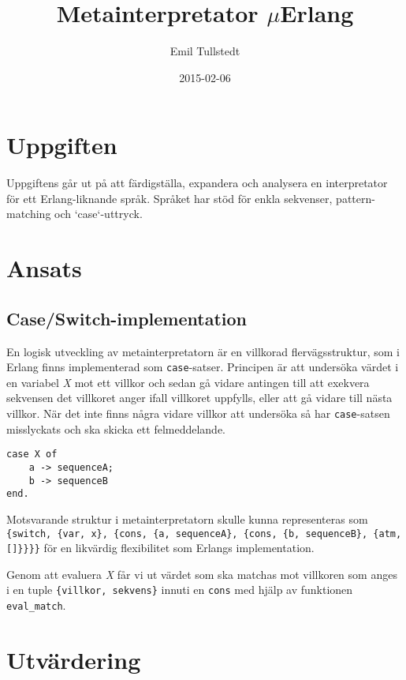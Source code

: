 \documentclass[a4paper, 11pt]{article}
\title{Metainterpretator $\mu$Erlang}
\author{Emil Tullstedt}
\date{2015-02-06}
\begin{document}
\maketitle

\section{Uppgiften}

Uppgiftens går ut på att färdigställa, expandera och analysera en interpretator för ett Erlang-liknande språk. Språket har stöd för enkla sekvenser, pattern-matching och `case`-uttryck.

\section{Ansats}

\subsection{Case/Switch-implementation}
En logisk utveckling av metainterpretatorn är en villkorad flervägsstruktur, som i Erlang finns implementerad som \texttt{case}-satser. Principen är att under\-söka värdet i en variabel \textit{X} mot ett villkor och sedan gå vidare antingen till att exekvera sekvensen det villkoret anger ifall villkoret uppfylls, eller att gå vidare till nästa villkor. När det inte finns några vidare villkor att undersöka så har \texttt{case}-satsen misslyckats och ska skicka ett fel\-meddel\-ande.

\begin{lstlisting}
case X of
    a -> sequenceA;
    b -> sequenceB
end.
\end{lstlisting}

Motsvarande struktur i metainterpretatorn skulle kunna representeras som \\ \lstinline${switch, {var, x}, {cons, {a, sequenceA}, {cons, {b, sequenceB}, {atm, []}}}}$ för en likvärdig flexibilitet som Erlangs implementation.

Genom att evaluera \textit{X} får vi ut värdet som ska matchas mot villkoren som anges i en tuple \lstinline${villkor, sekvens}$ innuti en \texttt{cons} med hjälp av funktionen \texttt{eval_match}.

\section{Utvärdering}
\end{document}
